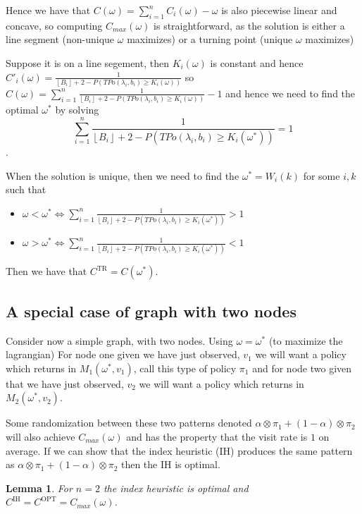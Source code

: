 \documentclass[a4paper,10pt]{article}
\newcommand{\floor}[1]{\left \lfloor #1 \right \rfloor}
\newtheorem{lemma}[theorem]{Lemma}
\theoremstyle{definition}
\theoremstyle{definition}
\theoremstyle{remark}
\theoremstyle{definition}
\begin{document}
Hence we have that $C(\omega)=\sum\limits_{i=1}^{n} C_{i}(\omega) -\omega$ is also piecewise linear and concave, so computing $C_{max}(\omega)$ is straightforward, as the solution is either a line segment (non-unique $\omega$ maximizes) or a turning point (unique $\omega$ maximizes)

Suppose it is on a line segement, then $K_{i}(\omega)$ is constant and hence $C'_{i}(\omega)=\frac{1}{\floor{B_{i}}+2-P(TPo(\lambda_{i},b_{i}) \geq K_{i}(\omega))}$ so $C(\omega)=\sum\limits_{i=1}^{n} \frac{1}{\floor{B_{i}}+2-P(TPo(\lambda_{i},b_{i}) \geq K_{i}(\omega))} -1$ and hence we need to find the optimal $\omega^{*}$ by solving 
$$\sum\limits_{i=1}^{n} \frac{1}{\floor{B_{i}}+2-P(TPo(\lambda_{i},b_{i}) \geq K_{i}(\omega^{*}))} =1 $$.

When the solution is unique, then we need to find the $\omega^{*}=W_{i}(k)$ for some $i,k$ such that
\begin{itemize}
\item $\omega<\omega^{*} \iff \sum\limits_{i=1}^{n} \frac{1}{\floor{B_{i}}+2-P(TPo(\lambda_{i},b_{i}) \geq K_{i}(\omega^{*}))} > 1$
\item $\omega>\omega^{*} \iff \sum\limits_{i=1}^{n} \frac{1}{\floor{B_{i}}+2-P(TPo(\lambda_{i},b_{i}) \geq K_{i}(\omega^{*}))} < 1$
\end{itemize}

Then we have that $C^{\text{TR}}=C(\omega^{*})$.

\subsection{A special case of graph with two nodes}
Consider now a simple graph, with two nodes. Using $\omega=\omega^{*}$ (to maximize the lagrangian) For node one given we have just observed, $v_{1}$ we will want a policy which returns in $M_{1}(\omega^{*},v_{1})$, call this type of policy $\pi_{1}$ and for node two given that we have just observed, $v_{2}$ we will want a policy which returns in $M_{2}(\omega^{*},v_{2})$.

Some randomization between these two patterns denoted $\alpha \otimes \pi_{1} + (1-\alpha) \otimes \pi_{2}$ will also achieve $C_{max}(\omega)$ and has the property that the visit rate is $1$ on average. If we can show that the index heuristic (IH) produces the same pattern as $\alpha \otimes \pi_{1} + (1-\alpha) \otimes \pi_{2}$ then the IH is optimal.

\begin{lemma}
For $n=2$ the index heuristic is optimal and $C^{\text{IH}}=C^{\text{OPT}}=C_{max}(\omega)$.
\end{lemma}
\end{document}
